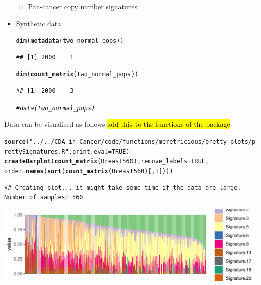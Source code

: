 \documentclass{article}\usepackage[]{graphicx}\usepackage[]{color}
\makeatletter
\def\maxwidth{ %
  \ifdim\Gin@nat@width>\linewidth
    \linewidth
  \else
    \Gin@nat@width
  \fi
}
\newcommand{\hlnum}[1]{\textcolor[rgb]{0.686,0.059,0.569}{#1}}%
\newcommand{\hlstr}[1]{\textcolor[rgb]{0.192,0.494,0.8}{#1}}%
\newcommand{\hlcom}[1]{\textcolor[rgb]{0.678,0.584,0.686}{\textit{#1}}}%
\newcommand{\hlstd}[1]{\textcolor[rgb]{0.345,0.345,0.345}{#1}}%
\newcommand{\hlkwc}[1]{\textcolor[rgb]{0.333,0.667,0.333}{#1}}%
\newcommand{\hlkwd}[1]{\textcolor[rgb]{0.737,0.353,0.396}{\textbf{#1}}}%
\newenvironment{kframe}{%
 \def\at@end@of@kframe{}%
 \ifinner\ifhmode%
  \def\at@end@of@kframe{\end{minipage}}%
  \begin{minipage}{\columnwidth}%
 \fi\fi%
 \def\FrameCommand##1{\hskip\@totalleftmargin \hskip-\fboxsep
 \colorbox{shadecolor}{##1}\hskip-\fboxsep
     \hskip-\linewidth \hskip-\@totalleftmargin \hskip\columnwidth}%
 \MakeFramed {\advance\hsize-\width
   \@totalleftmargin\z@ \linewidth\hsize
   \@setminipage}}%
 {\par\unskip\endMakeFramed%
 \at@end@of@kframe}
\newenvironment{knitrout}{}{} %
\makeatother
\begin{document}
\begin{itemize}
\begin{itemize}
\item Pan-cancer copy number signatures
\end{itemize}
\item Synthetic data
\begin{knitrout}
\color{fgcolor}\begin{kframe}
\begin{alltt}
\hlkwd{dim}\hlstd{(}\hlkwd{metadata}\hlstd{(two_normal_pops))}
\end{alltt}
\begin{verbatim}
## [1] 2000    1
\end{verbatim}
\begin{alltt}
\hlkwd{dim}\hlstd{(}\hlkwd{count_matrix}\hlstd{(two_normal_pops))}
\end{alltt}
\begin{verbatim}
## [1] 2000    3
\end{verbatim}
\begin{alltt}
\hlcom{#data(two_normal_pops)}
\end{alltt}
\end{kframe}
\end{knitrout}
\end{itemize}

Data can be visualised as follows \hl{add this to the functions of the package}

\begin{knitrout}
\color{fgcolor}\begin{kframe}
\begin{alltt}
\hlkwd{source}\hlstd{(}\hlstr{"../../CDA_in_Cancer/code/functions/meretricious/pretty_plots/prettySignatures.R"}\hlstd{,} \hlkwc{print.eval} \hlstd{=} \hlnum{TRUE}\hlstd{)}
\hlkwd{createBarplot}\hlstd{(}\hlkwd{count_matrix}\hlstd{(Breast560),} \hlkwc{remove_labels} \hlstd{=} \hlnum{TRUE}\hlstd{,}
              \hlkwc{order} \hlstd{=} \hlkwd{names}\hlstd{(}\hlkwd{sort}\hlstd{(}\hlkwd{count_matrix}\hlstd{(Breast560)[,}\hlnum{1}\hlstd{])))}
\end{alltt}
\begin{verbatim}
## Creating plot... it might take some time if the data are large. Number of samples: 560
\end{verbatim}
\end{kframe}
\includegraphics[width=\maxwidth]{figure/unnamed-chunk-8-1} 

\end{knitrout}
\end{document}
